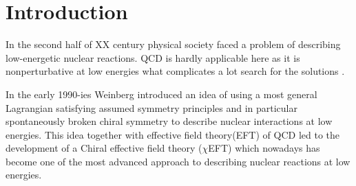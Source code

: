 \chapter{Introduction}
\label{introduction}


    
    
    
        
In the second half of XX century physical society faced
a problem of describing low-energetic nuclear reactions.
QCD is hardly applicable here as it is nonperturbative 
at low energies what complicates a lot search for the solutions \cite{Machleidt2011}. 

In the early 1990-ies Weinberg \cite{WEINBERG1990,WEINBERG1991} introduced 
an idea of using a most general Lagrangian
satisfying assumed symmetry principles and in particular
spontaneously broken chiral symmetry to 
describe nuclear interactions at low energies.
This idea together with effective field theory(EFT) of QCD 
led to the development of 
a Chiral effective field theory ($\chi$EFT)
which nowadays has become one of the most advanced approach to
describing nuclear reactions at low energies.
 
